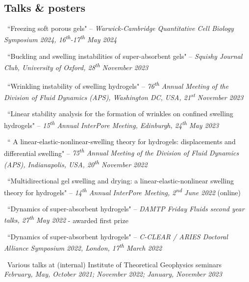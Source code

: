 \documentclass[a4paper]{article}
\begin{document}
\begin{multicols}{2}
    	\subsection*{Talks \& posters}
            \begin{small}
                \begin{itemize}
                    {\color{gray}\item \faVolumeUp \, ``Freezing soft porous gels" -- \emph{Warwick-Cambridge Quantitative Cell Biology Symposium 2024, 16\textsuperscript{th}-17\textsuperscript{th} May 2024}}
                    \item \faVolumeUp \, ``Buckling and swelling instabilities of super-absorbent gels" -- \emph{Squishy Journal Club, University of Oxford, 28\textsuperscript{th} November 2023}
                    \item \faVolumeUp \, ``Wrinkling instability of swelling hydrogels" -- \emph{76\textsuperscript{th} Annual Meeting of the Division of Fluid Dynamics (APS), Washington DC, USA, 21\textsuperscript{st} November 2023}
                    \item \faVolumeUp \, ``Linear stability analysis for the formation of wrinkles on confined swelling hydrogels" -- \emph{15\textsuperscript{th} Annual InterPore Meeting, Edinburgh, 24\textsuperscript{th} May 2023}
                    \item \faVolumeUp \, `` A linear-elastic-nonlinear-swelling theory for hydrogels: displacements and differential swelling" -- \emph{75\textsuperscript{th} Annual Meeting of the Division of Fluid Dynamics (APS), Indianapolis, USA, 20\textsuperscript{th} November 2022}
                    \item \faVolumeUp \, ``Multidirectional gel swelling and drying: a linear-elastic-nonlinear swelling theory for hydrogels" -- \emph{14\textsuperscript{th} Annual InterPore Meeting, 2\textsuperscript{nd} June 2022} (online)
                    \item \faVolumeUp \, ``Dynamics of super-absorbent hydrogels" -- \emph{DAMTP Friday Fluids second year talks, 27\textsuperscript{th} May 2022} - awarded first prize
                    \item \faClipboard \, ``Dynamics of super-absorbent hydrogels" -- \emph{C-CLEAR / ARIES Doctoral Alliance Symposium 2022, London, 17\textsuperscript{th} March 2022}
                    \item \faVolumeUp \, Various talks at (internal) Institute of Theoretical Geophysics seminars \emph{February, May, October 2021; November 2022; January, November 2023}

\end{itemize}
\end{small}
\end{multicols}
\end{document}
